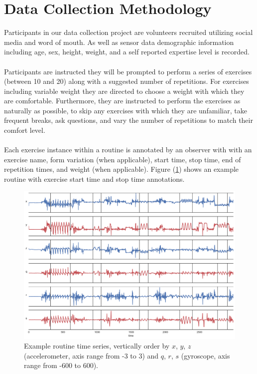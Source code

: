 \documentclass[12pt]{report}
\newcommand{\1}[0]{\mathbbm{1}}
\begin{document}
\section{Data Collection Methodology}
Participants in our data collection project are volunteers recruited utilizing social media
and word of mouth. As well as sensor data demographic information including age, sex, height, weight,
and a self reported expertise level is recorded. 
\\\\
Participants are instructed they will be prompted to perform a series of exercises (between 10 and 20)
along with a suggested number of repetitions. For exercises including variable weight they are directed
to choose a weight with which they are comfortable. Furthermore, they are instructed to perform the exercises
as naturally as possible, to skip any exercises with which they are unfamiliar, take frequent breaks,
ask questions, and vary the number of repetitions to match their comfort level.
\\\\
Each exercise instance within a routine is annotated by an observer with with an exercise name, 
form variation (when applicable), start time, stop time, end of repetition times, and weight (when applicable). 
Figure (\ref{fig:routine}) shows an example routine with exercise start time and stop time annotations.

\begin{figure}[ht!]
    \centering
    \includegraphics[width=1\textwidth]{img/routine_380.pdf}
    \caption{Example routine time series, 
    vertically order by $x$, $y$, $z$ (accelerometer, axis range from -3 to 3) 
    and $q$, $r$, $s$ (gyroscope, axis range from -600 to 600).}
    \label{fig:routine}
\end{figure}
\end{document}
